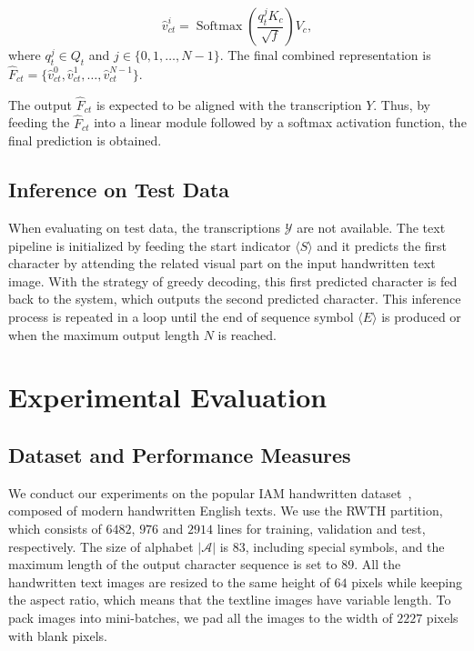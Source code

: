 \documentclass[10pt,twocolumn,letterpaper]{article}
\begin{document}
\begin{equation}
    \hat{v}_{ct}^{i} = \operatorname{Softmax}\left(\frac{q_{t}^{j}K_{c}}{\sqrt{f}}\right)V_{c},
\end{equation}
where $q_{t}^{j} \in Q_{t}$ and $j \in \{0, 1, \ldots, N-1\}$. The final combined representation is  $\hat{F}_{ct}=\{\hat{v}_{ct}^{0}, \hat{v}_{ct}^{1}, \ldots, \hat{v}_{ct}^{N-1}\}$.

The output $\hat{F}_{ct}$ is expected to be aligned with the transcription $Y$. Thus, by feeding the $\hat{F}_{ct}$ into a linear module followed by a softmax activation function, the final prediction is obtained. 



\subsection{Inference on Test Data}
When evaluating on test data, the transcriptions $\mathcal{Y}$ are not available. The text pipeline is initialized by feeding the start indicator $\langle S \rangle$ and it predicts the first character by attending the related visual part on the input handwritten text image. With the strategy of greedy decoding, this first predicted character is fed back to the system, which outputs the second predicted character. This inference process is repeated in a loop until the end of sequence symbol $\langle E\rangle$ is produced or when the maximum output length $N$ is reached. 
\section{Experimental Evaluation}
\subsection{Dataset and Performance Measures}
We conduct our experiments on the popular IAM handwritten dataset~\cite{marti2002iam}, composed of modern handwritten English texts. We use the RWTH partition, which consists of $6482$, $976$ and $2914$ lines for training, validation and test, respectively. The size of alphabet $|\mathcal{A}|$ is $83$, including special symbols, and the maximum length of the output character sequence is set to $89$. All the handwritten text images are resized to the same height of $64$ pixels while keeping the aspect ratio, which means that the textline images have variable length. To pack images into mini-batches, we pad all the images to the width of $2227$ pixels with blank pixels.
\end{document}
